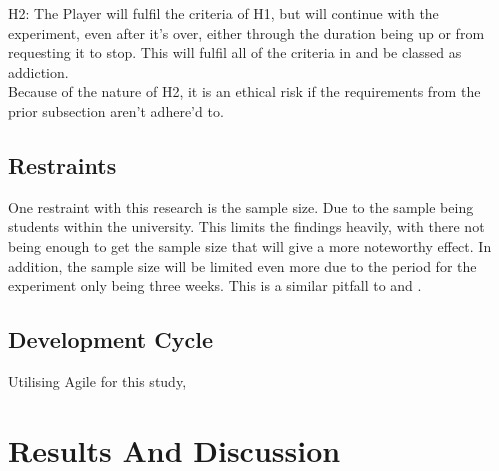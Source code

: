\documentclass[conference]{IEEEtran}
\begin{document}
H2: The Player will fulfil the criteria of H1, but will continue with the experiment, even after it's over, either through the duration being up or from requesting it to stop. This will fulfil all of the criteria in \cite{NHSHamp24} and be classed as addiction. \\

Because of the nature of H2, it is an ethical risk if the requirements from the prior subsection aren't adhere'd to.

\subsection {Restraints}
One restraint with this research is the sample size. Due to the sample being students within the university. This limits the findings heavily, with there not being enough to get the sample size that will give a more noteworthy effect. In addition, the sample size will be limited even more due to the period for the experiment only being three weeks. This is a similar pitfall to \cite{Naaj2021} and \cite{Ruqeyya2022}.\\

\subsection{Development Cycle}
Utilising Agile for this study, 

\section{Results And Discussion}
\begin{table}[H]
\centering
{}
\caption{Table 1 - The data collected from the experiment over two weeks.}
\label{data-table}
\end{table}
\end{document}
